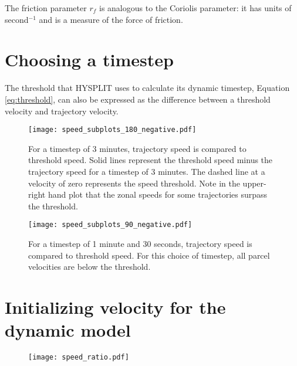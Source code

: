 The friction parameter $r_f$ is analogous to the Coriolis parameter: it has units of second$^{-1}$ and is a measure of the force of friction.

\section{Choosing a timestep} \label{sec:timestep}
The threshold that HYSPLIT uses to calculate its dynamic timestep, Equation \ref{eq:threshold}, can also be expressed as the difference between a threshold velocity and trajectory velocity.

\begin{figure}
    \texttt{[image: speed\_subplots\_180\_negative.pdf]}
    \centering
    \caption{For a timestep of 3 minutes, trajectory speed is compared to threshold speed.
    Solid lines represent the threshold speed minus the trajectory speed for a timestep of 3 minutes. 
    The dashed line at a velocity of zero represents the speed threshold.
    Note in the upper-right hand plot that the zonal speeds for some trajectories surpass the threshold. }
    \label{fig:speed_subplots_180_negative}
\end{figure}

\begin{figure}
    \texttt{[image: speed\_subplots\_90\_negative.pdf]}
    \centering
    \caption{For a timestep of 1 minute and 30 seconds, trajectory speed is compared to threshold speed.
    For this choice of timestep, all parcel velocities are below the threshold.}
    \label{speed_subplots_90_negative}
\end{figure}

\section{Initializing velocity for the dynamic model}

\begin{figure}
    \centering
    \texttt{[image: speed\_ratio.pdf]}
    \caption{}
    \label{fig:speed_ratio}
\end{figure}

